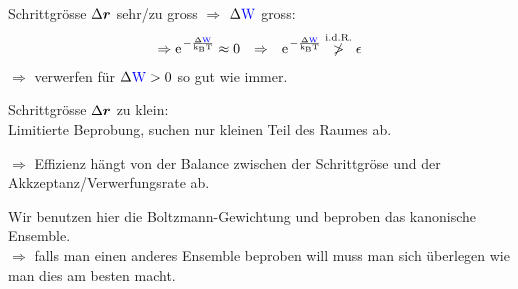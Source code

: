 \begin{notebox}\nospacing
  \begin{numberlist}
      \item Schrittgrösse $\Delta\boldsymbol r $ sehr/zu gross $\Rightarrow$ $\Delta\textcolor{blue}{\mathrm{W}}$ gross:
      \begin{align*}
        \Rightarrow \e^{-\frac{\Delta\Wpot}{\kb\Tz}}\approx0&&\Rightarrow&&\e^{-\frac{\Delta\Wpot}{\kb\Tz}}\stackrel{\text{i.d.R.}}{\ngtr}\epsilon
      \end{align*}
      $\Rightarrow$ verwerfen für $\Delta\textcolor{blue}{\mathrm{W}}>0$ so gut wie immer.
        \item Schrittgrösse $\Delta\boldsymbol r $ zu klein:\\
      Limitierte Beprobung, suchen nur kleinen Teil des Raumes ab.
  \end{numberlist}
  $\Rightarrow$ Effizienz hängt von der Balance zwischen der Schrittgröse und der Akkzeptanz/Verwerfungsrate ab.
\end{notebox}
\begin{notebox}[Nebenbemerkung]
  Wir benutzen hier die Boltzmann-Gewichtung und beproben das kanonische Ensemble.\\
  $\Rightarrow$ falls man einen anderes Ensemble beproben will muss man sich überlegen wie man dies am besten macht.
\end{notebox}
